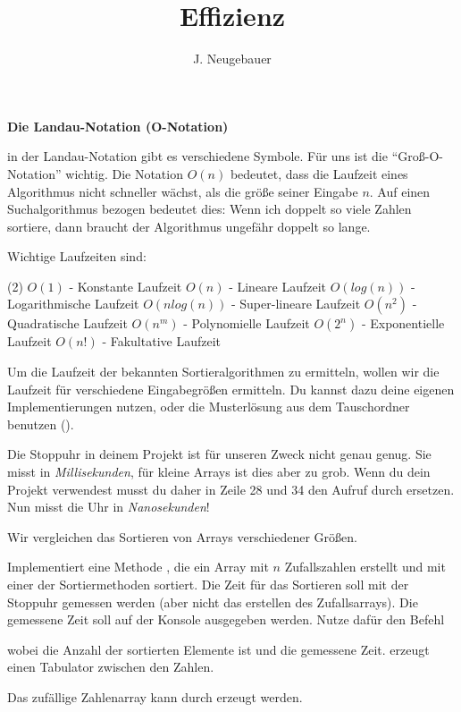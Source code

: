 \documentclass[10pt, a4paper]{scrartcl}
\author{J. Neugebauer}
\title{Effizienz}
\date{\Heute}
\begin{document}
\ReiheTitel

\begin{infobox}
	\textbf{Die Landau-Notation (O-Notation)}
	
	in der Landau-Notation gibt es verschiedene Symbole. Für uns ist die \enquote{Groß-O-Notation} wichtig. Die Notation $O(n)$ bedeutet, dass die Laufzeit eines Algorithmus nicht schneller wächst, als die größe seiner Eingabe $n$. Auf einen Suchalgorithmus bezogen bedeutet dies: Wenn ich doppelt so viele Zahlen sortiere, dann braucht der Algorithmus ungefähr doppelt so lange.
	
	\smallskip
	Wichtige Laufzeiten sind:
	\begin{tasks}[style=itemize](2)
		\task $O(1)$ - Konstante Laufzeit
		\task $O(n)$ - Lineare Laufzeit
		\task $O(log(n))$ - Logarithmische Laufzeit
		\task $O(nlog(n))$ - Super-lineare Laufzeit
		\task $O(n^2)$ - Quadratische Laufzeit
		\task $O(n^m)$ - Polynomielle Laufzeit
		\task $O(2^n)$ - Exponentielle Laufzeit
		\task $O(n!)$ - Fakultative Laufzeit
	\end{tasks}
\end{infobox}

Um die Laufzeit der bekannten Sortieralgorithmen zu ermitteln, wollen wir die Laufzeit für verschiedene Eingabegrößen ermitteln. Du kannst dazu deine eigenen Implementierungen nutzen, oder die Musterlösung aus dem Tauschordner benutzen ().

\begin{rahmen}{\Large\symGlocke}
Die Stoppuhr in deinem Projekt ist für unseren Zweck nicht genau genug. Sie misst in \emph{Millisekunden}, für kleine Arrays ist dies aber zu grob. Wenn du dein Projekt verwendest musst du daher in Zeile 28 und 34 den Aufruf  durch  ersetzen. Nun misst die Uhr in \emph{Nanosekunden}!
\end{rahmen}

Wir vergleichen das Sortieren von Arrays verschiedener Größen.

\begin{aufgabe}
	Implementiert eine Methode , die ein Array mit $n$ Zufallszahlen erstellt und mit einer der Sortiermethoden sortiert. Die Zeit für das Sortieren soll mit der Stoppuhr gemessen werden (aber nicht das erstellen des Zufallsarrays). Die gemessene Zeit soll auf der Konsole ausgegeben werden. Nutze dafür den Befehl
	
	
	wobei  die Anzahl der sortierten Elemente ist und  die gemessene Zeit.  erzeugt einen Tabulator zwischen den Zahlen.
	
	Das zufällige Zahlenarray kann durch  erzeugt werden.
\end{aufgabe}
\end{document}
